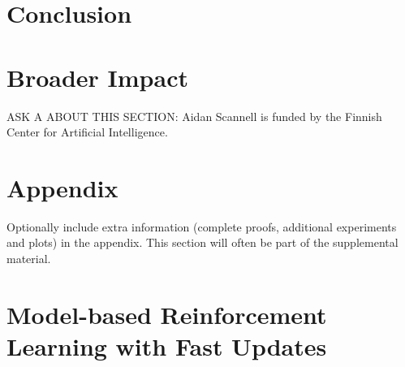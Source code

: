 \documentclass{article}
\begin{document}
\section{Conclusion} \label{sec:conclusion}


\section*{Broader Impact}

\begin{ack}
ASK A ABOUT THIS SECTION:
Aidan Scannell is funded by the Finnish Center for Artificial Intelligence.
\end{ack}





%
\begingroup
\small


\endgroup

\clearpage




\appendix

\section{Appendix}

Optionally include extra information (complete proofs, additional experiments and plots) in the appendix.
This section will often be part of the supplemental material.

\section{Model-based Reinforcement Learning with Fast Updates}
\end{document}
